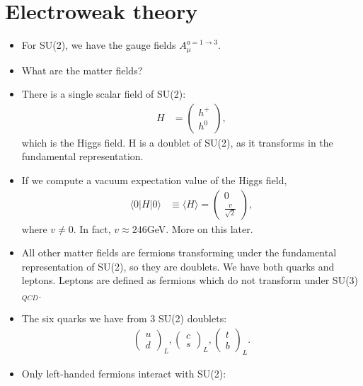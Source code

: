 \documentclass[a4paper, 11pt, normalem]{report}
\begin{document}
\section{Electroweak theory}
\begin{itemize}
    \item For SU(2), we have the gauge fields $A_\mu^{a=1\to3}$.
    \item What are the matter fields?
    \item There is a single scalar field of SU(2):
        \begin{align}
            H &= \begin{pmatrix}h^+\\h^0\end{pmatrix},
        \end{align}
        which is the Higgs field.
        H is a doublet of SU(2), as it transforms in the fundamental representation.
    \item If we compute a vacuum expectation value of the Higgs field,
        \begin{align}
            \langle0|H|0\rangle &\equiv \langle H\rangle = \begin{pmatrix}0\\\frac{v}{\sqrt{2}}\end{pmatrix},
        \end{align}
        where $v\neq0$. In fact, $v\approx246$GeV.
        More on this later.
    \item All other matter fields are fermions transforming under the fundamental representation of SU(2), so they are doublets.
        We have both quarks and leptons.
        Leptons are defined as fermions which do not transform under SU(3)$_{QCD}$.
    \item The six quarks we have from 3 SU(2) doublets:
        \begin{align}
            \begin{pmatrix}u\\d\end{pmatrix}_L,
            \begin{pmatrix}c\\s\end{pmatrix}_L,
            \begin{pmatrix}t\\b\end{pmatrix}_L.
        \end{align}
    \item Only left-handed fermions interact with SU(2):
        \begin{align}

\end{align}
\end{itemize}
\end{document}
